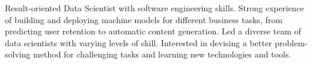 

\begin{cvparagraph}

Result-oriented Data Scientist with software engineering skills. Strong experience of building and deploying machine models for different business tasks, from predicting user retention to automatic content generation. Led a diverse team of data scientists with varying levels of skill. Interested in devising a better problem-solving method for challenging tasks and learning new technologies and tools.
\end{cvparagraph}
